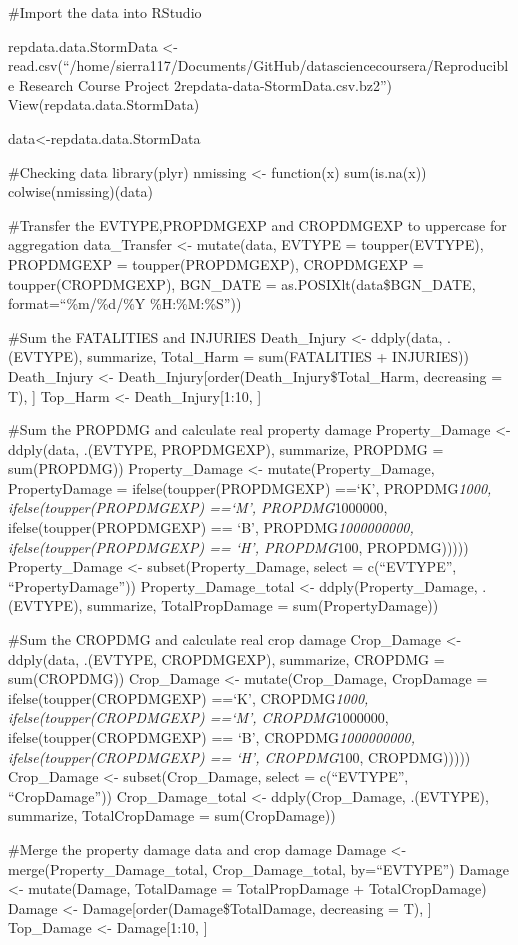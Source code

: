 \documentclass[
]{article}
\author{}
\date{\vspace{-2.5em}}
\begin{document}
\#Import the data into RStudio

repdata.data.StormData \textless-
read.csv(``/home/sierra117/Documents/GitHub/datasciencecoursera/Reproducible
Research Course Project 2repdata-data-StormData.csv.bz2'')
View(repdata.data.StormData)

data\textless-repdata.data.StormData

\#Checking data library(plyr) nmissing \textless- function(x)
sum(is.na(x)) colwise(nmissing)(data)

\#Transfer the EVTYPE,PROPDMGEXP and CROPDMGEXP to uppercase for
aggregation data\_Transfer \textless- mutate(data, EVTYPE =
toupper(EVTYPE), PROPDMGEXP = toupper(PROPDMGEXP), CROPDMGEXP =
toupper(CROPDMGEXP), BGN\_DATE = as.POSIXlt(data\$BGN\_DATE,
format=``\%m/\%d/\%Y \%H:\%M:\%S''))

\#Sum the FATALITIES and INJURIES Death\_Injury \textless- ddply(data,
.(EVTYPE), summarize, Total\_Harm = sum(FATALITIES + INJURIES))
Death\_Injury \textless-
Death\_Injury{[}order(Death\_Injury\$Total\_Harm, decreasing = T), {]}
Top\_Harm \textless- Death\_Injury{[}1:10, {]}

\#Sum the PROPDMG and calculate real property damage Property\_Damage
\textless- ddply(data, .(EVTYPE, PROPDMGEXP), summarize, PROPDMG =
sum(PROPDMG)) Property\_Damage \textless- mutate(Property\_Damage,
PropertyDamage = ifelse(toupper(PROPDMGEXP) ==`K', PROPDMG\emph{1000,
ifelse(toupper(PROPDMGEXP) ==`M', PROPDMG}1000000,
ifelse(toupper(PROPDMGEXP) == `B', PROPDMG\emph{1000000000,
ifelse(toupper(PROPDMGEXP) == `H', PROPDMG}100, PROPDMG)))))
Property\_Damage \textless- subset(Property\_Damage, select =
c(``EVTYPE'', ``PropertyDamage'')) Property\_Damage\_total \textless-
ddply(Property\_Damage, .(EVTYPE), summarize, TotalPropDamage =
sum(PropertyDamage))

\#Sum the CROPDMG and calculate real crop damage Crop\_Damage \textless-
ddply(data, .(EVTYPE, CROPDMGEXP), summarize, CROPDMG = sum(CROPDMG))
Crop\_Damage \textless- mutate(Crop\_Damage, CropDamage =
ifelse(toupper(CROPDMGEXP) ==`K', CROPDMG\emph{1000,
ifelse(toupper(CROPDMGEXP) ==`M', CROPDMG}1000000,
ifelse(toupper(CROPDMGEXP) == `B', CROPDMG\emph{1000000000,
ifelse(toupper(CROPDMGEXP) == `H', CROPDMG}100, CROPDMG)))))
Crop\_Damage \textless- subset(Crop\_Damage, select = c(``EVTYPE'',
``CropDamage'')) Crop\_Damage\_total \textless- ddply(Crop\_Damage,
.(EVTYPE), summarize, TotalCropDamage = sum(CropDamage))

\#Merge the property damage data and crop damage Damage \textless-
merge(Property\_Damage\_total, Crop\_Damage\_total, by=``EVTYPE'')
Damage \textless- mutate(Damage, TotalDamage = TotalPropDamage +
TotalCropDamage) Damage \textless- Damage{[}order(Damage\$TotalDamage,
decreasing = T), {]} Top\_Damage \textless- Damage{[}1:10, {]}
\end{document}
